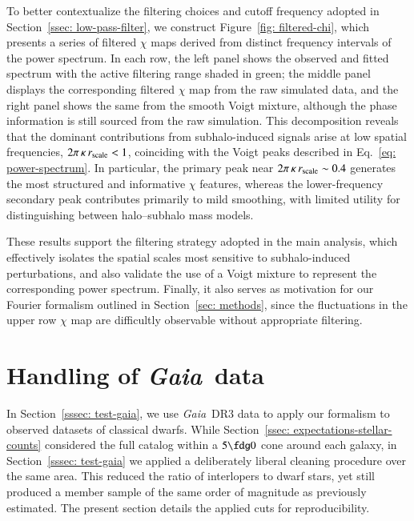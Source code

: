 \documentclass[fleqn,usenatbib]{mnras}
\newcommand{\gaia}{{\sl Gaia}}
\begin{document}
To better contextualize the filtering choices and cutoff frequency adopted in Section~\ref{ssec: low-pass-filter}, we construct Figure~\ref{fig: filtered-chi}, which presents a series of filtered $\chi$ maps derived from distinct frequency intervals of the power spectrum. In each row, the left panel shows the observed and fitted spectrum with the active filtering range shaded in green; the middle panel displays the corresponding filtered $\chi$ map from the raw simulated data, and the right panel shows the same from the smooth Voigt mixture, although the phase information is still sourced from the raw simulation. This decomposition reveals that the dominant contributions from subhalo-induced signals arise at low spatial frequencies, $2 \pi \, \kappa \, r_{\rm scale} < 1$, coinciding with the Voigt peaks described in Eq.~\ref{eq: power-spectrum}. In particular, the primary peak near $2 \pi \, \kappa \, r_{\rm scale} \sim 0.4$ generates the most structured and informative $\chi$ features, whereas the lower-frequency secondary peak contributes primarily to mild smoothing, with limited utility for distinguishing between halo–subhalo mass models. 

These results support the filtering strategy adopted in the main analysis, which effectively isolates the spatial scales most sensitive to subhalo-induced perturbations, and also validate the use of a Voigt mixture to represent the corresponding power spectrum. Finally, it also serves as motivation for our Fourier formalism outlined in Section~\ref{sec: methods}, since the fluctuations in the upper row $\chi$ map are difficultly observable without appropriate filtering.

\section{Handling of \gaia\ data} \label{app: data-clean}

In Section~\ref{sssec: test-gaia}, we use \gaia\ DR3 data to apply our formalism to observed datasets of classical dwarfs. While Section~\ref{ssec: expectations-stellar-counts} considered the full catalog within a $5\fdg0$ cone around each galaxy, in Section~\ref{sssec: test-gaia} we applied a deliberately liberal cleaning procedure over the same area. This reduced the ratio of interlopers to dwarf stars, yet still produced a member sample of the same order of magnitude as previously estimated. The present section details the applied cuts for reproducibility.
\end{document}
